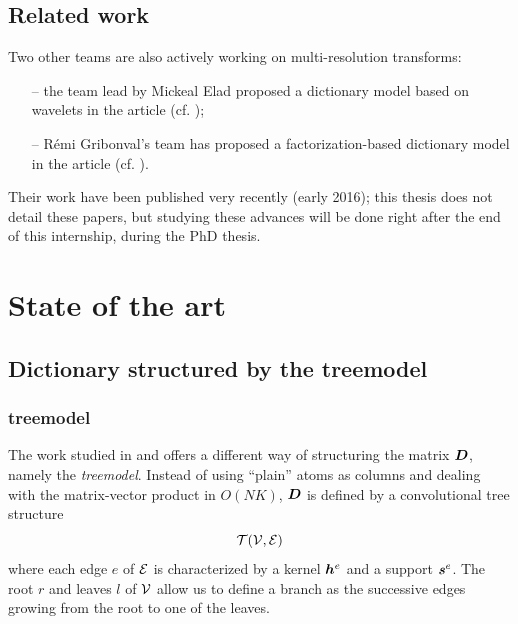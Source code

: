 \section{Related work}
Two other teams are also actively working on multi-resolution transforms:
\begin{itemize}
	\item[--] the team lead by Mickeal Elad proposed a dictionary model based on wavelets in the article  (cf. \cite{sulam_trainlets:_2016});
	\item[--] Rémi Gribonval’s team has proposed a factorization-based dictionary model in the article  (cf. \cite{magoarou_flexible_2016}).
\end{itemize}
Their work have been published very recently (early 2016); this thesis does not detail these papers, but studying these advances will be done right after the end of this internship, during the PhD thesis.

\chapter{State of the art}

\section{Dictionary structured by the \Gls{treemodel}}

\subsection{\Gls{treemodel}}\label{sec_tree_model}
The work studied in \cite{chabiron_toward_2015} and \cite{chabiron_optimization_2016} offers a different way of structuring the matrix $\bm{D}$, namely the \emph{\Gls{treemodel}}. Instead of using “plain” atoms as columns and dealing with the matrix-vector product in $O(NK)$, $\bm{D}$ is defined by a convolutional tree structure $$\mathcal T(\mathcal V,\mathcal E)$$ where each edge $e$ of $\mathcal E$ is characterized by a kernel $\bm{h}^e$ and a support $\bm{s}^e$. The root $r$ and leaves $l$ of $\mathcal V$ allow us to define a branch as the successive edges growing from the root to one of the leaves.

